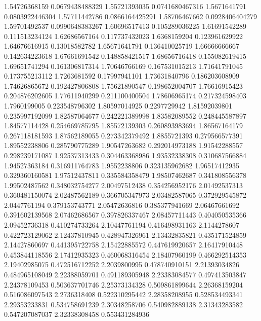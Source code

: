   1.54726368159  0.0679438488329
  1.55721393035  0.0741680467316
   1.5671641791  0.0803922446304
  1.57711442786  0.0866164425291
  1.58706467662  0.0928406404279
  1.59701492537  0.0990648383267
  1.60696517413   0.105289036225
  1.61691542289   0.111513234124
  1.62686567164   0.117737432023
   1.6368159204   0.123961629922
  1.64676616915    0.13018582782
  1.65671641791   0.136410025719
  1.66666666667   0.142634223618
  1.67661691542   0.148858421517
  1.68656716418   0.155082619415
  1.69651741294   0.161306817314
  1.70646766169   0.167531015213
  1.71641791045   0.173755213112
   1.7263681592    0.17997941101
  1.73631840796   0.186203608909
  1.74626865672   0.192427806808
  1.75621890547   0.198652004707
  1.76616915423   0.204876202605
  1.77611940299   0.211100400504
  1.78606965174   0.217324598403
   1.7960199005   0.223548796302
  1.80597014925     0.2297729942
  1.81592039801   0.235997192099
  1.82587064677   0.242221389998
  1.83582089552   0.248445587897
  1.84577114428   0.254669785795
  1.85572139303   0.260893983694
  1.86567164179   0.267118181593
  1.87562189055   0.273342379492
   1.8855721393   0.279566577391
  1.89552238806   0.285790775289
  1.90547263682   0.292014973188
  1.91542288557   0.298239171087
  1.92537313433   0.304463368986
  1.93532338308   0.310687566884
  1.94527363184   0.316911764783
   1.9552238806   0.323135962682
  1.96517412935   0.329360160581
  1.97512437811   0.335584358479
  1.98507462687   0.341808556378
  1.99502487562   0.348032754277
  2.00497512438   0.354256952176
  2.01492537313   0.360481150074
  2.02487562189   0.366705347973
  2.03482587065   0.372929545872
   2.0447761194   0.379153743771
  2.05472636816   0.385377941669
  2.06467661692   0.391602139568
  2.07462686567   0.397826337467
  2.08457711443   0.404050535366
  2.09452736318   0.410274733264
  2.10447761194   0.416498931163
   2.1144278607   0.422723129062
  2.12437810945   0.428947326961
  2.13432835821   0.435171524859
  2.14427860697   0.441395722758
  2.15422885572   0.447619920657
  2.16417910448   0.453844118556
  2.17412935323   0.460068316454
  2.18407960199   0.466292514353
  2.19402985075   0.472516712252
   2.2039800995   0.478740910151
  2.21393034826   0.484965108049
  2.22388059701   0.491189305948
  2.23383084577   0.497413503847
  2.24378109453   0.503637701746
  2.25373134328   0.509861899644
  2.26368159204   0.516086097543
   2.2736318408   0.522310295442
  2.28358208955   0.528534493341
  2.29353233831   0.534758691239
  2.30348258706   0.540982889138
  2.31343283582   0.547207087037
  2.32338308458   0.553431284936
